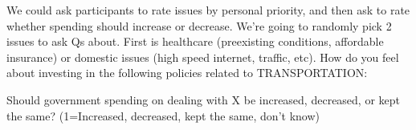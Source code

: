 \documentclass[
]{book}
\begin{document}
We could ask participants to rate issues by personal priority, and then ask to rate whether spending should increase or decrease. We're going to randomly pick 2 issues to ask Qs about. First is healthcare (preexisting conditions, affordable insurance) or domestic issues (high speed internet, traffic, etc).
How do you feel about investing in the following policies related to TRANSPORTATION:

Should government spending on dealing with X be increased, decreased, or kept the same? (1=Increased, decreased, kept the same, don't know)
\end{document}
